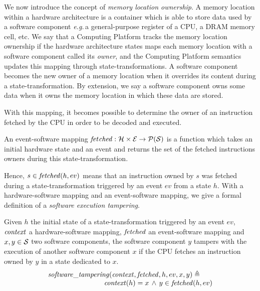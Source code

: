 We now introduce the concept of \textit{memory location ownership}. A memory
location within a hardware architecture is a container which is able to store
data used by a software component \emph{e.g.}\,a general-purpose register of a
CPU, a DRAM memory cell, etc. We say that a Computing Platform tracks the memory
location ownership if the hardware architecture states maps each memory location
with a software component called its \emph{owner}, and the Computing Platform
semantics updates this mapping through state-transformations. A software
component becomes the new owner of a memory location when it overrides its
content during a state-transformation. By extension, we say a software component
owns some data when it owns the memory location in which these data are stored.

With this mapping, it becomes possible to determine the owner of an instruction
fetched by the CPU in order to be decoded and executed.

\begin{definition}
  \label{def:evsoft}
  An event-software mapping
  $\mathit{fet\-ched}: \mathcal{H} \times \mathcal{E} \rightarrow \mathcal{P}(\mathcal{S})$ is a
  function which takes an initial hardware state and an event and returns the
  set of the fetched instructions owners during this state-transformation.
\end{definition}

Hence, $s \in \mathit{fetched}(h, ev)$ means that an instruction owned by $s$ was fetched
during a state-transformation triggered by an event $ev$ from a state $h$. With
a hardware-software mapping and an event-software mapping, we give a formal
definition of a \textit{software execution tampering}.

\begin{definition}
  \label{def:codeinjection}
  Given $h$ the initial state of a state-transformation triggered by an event
  $ev$, $\mathit{context}$ a hardware-software mapping, $\mathit{fetched}$ an event-software
  mapping and $x, y \in \mathcal{S}$ two software components, the software component
  $y$ tampers with the execution of another software component $x$ if the CPU
  fetches an instruction owned by $y$ in a state dedicated to $x$.
  \[ \begin{array}{l} \mathit{software\_tampering}(\mathit{context}, \mathit{fetched}, h, ev, x, y)
       \triangleq \\
       \qquad\qquad\qquad\qquad \mathit{context}(h) = x\,\wedge\,y \in \mathit{fetched}(h,ev)
     \end{array}
   \]
 \end{definition}

